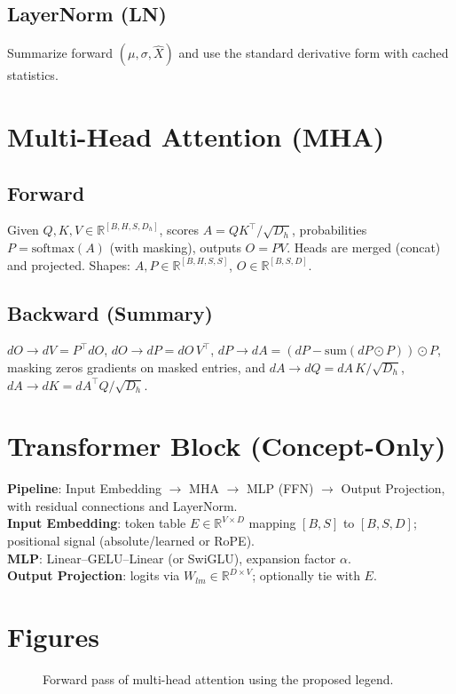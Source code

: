 \documentclass[10pt]{article}
\begin{document}
\subsection{LayerNorm (LN)}
Summarize forward $(\mu,\sigma,\hat X)$ and use the standard derivative form with cached statistics.

\section{Multi-Head Attention (MHA)}
\subsection{Forward}
Given $Q,K,V\in\mathbb{R}^{[B,H,S,D_h]}$, scores $A=QK^{\top}/\sqrt{D_h}$, probabilities $P=\text{softmax}(A)$ (with masking), outputs $O=PV$. Heads are merged (concat) and projected. Shapes: $A,P\in\mathbb{R}^{[B,H,S,S]}$, $O\in\mathbb{R}^{[B,S,D]}$.

\subsection{Backward (Summary)}
$dO\rightarrow dV=P^{\top}dO$, $dO\rightarrow dP=dO\,V^{\top}$, $dP\rightarrow dA=(dP-\text{sum}(dP\odot P))\odot P$, masking zeros gradients on masked entries, and $dA\rightarrow dQ=dA\,K/\sqrt{D_h}$, $dA\rightarrow dK=dA^{\top}Q/\sqrt{D_h}$.

\section{Transformer Block (Concept-Only)}
\textbf{Pipeline}: Input Embedding $\rightarrow$ MHA $\rightarrow$ MLP (FFN) $\rightarrow$ Output Projection, with residual connections and LayerNorm.\\
\textbf{Input Embedding}: token table $E\in\mathbb{R}^{V\times D}$ mapping $[B,S]$ to $[B,S,D]$; positional signal (absolute/learned or RoPE).\\
\textbf{MLP}: Linear--GELU--Linear (or SwiGLU), expansion factor $\alpha$.\\
\textbf{Output Projection}: logits via $W_{lm}\in\mathbb{R}^{D\times V}$; optionally tie with $E$.

\section{Figures}
\begin{figure}[h]
  \centering
  \caption{Forward pass of multi-head attention using the proposed legend.}
  \label{fig:mha-forward}
\end{figure}
\end{document}
